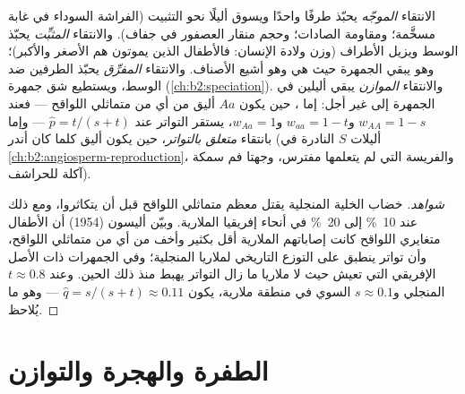 \begin{proposition}\label{prop:b2:population-genetics:kinds}
الانتقاء \emph{الموجّه} يحبّذ طرفًا واحدًا ويسوق
أليلًا نحو التثبيت (الفراشة السوداء في غابة مسخَّمة؛ ومقاومة
الصادات؛ وحجم منقار العصفور في جفاف).
والانتقاء \emph{المثبِّت} يحبّذ الوسط ويزيل
الأطراف (وزن ولادة الإنسان: فالأطفال الذين يموتون هم الأصغر
والأكبر)؛ وهو يبقي الجمهرة حيث هي وهو أشيع الأصناف.
والانتقاء \emph{المفرِّق} يحبّذ الطرفين
ضد الوسط، ويستطيع شق جمهرة
(\cref{ch:b2:speciation}). والانتقاء \emph{الموازن} يبقي
أليلين في الجمهرة إلى غير أجل: إما \emph{}، حين يكون $Aa$ أليق من أي من متماثلي اللواقح --- فعند
$w_{AA} = 1 - s$ و$w_{aa} = 1 - t$ و$w_{Aa} = 1$، يستقر التواتر
عند $\hat p = t/(s + t)$ --- وإما بانتقاء \emph{متعلق بالتواتر}،
حين يكون  أليق كلما كان أندر (أليلات
$S$ النادرة في \cref{ch:b2:angiosperm-reproduction}، والفريسة التي لم
يتعلمها مفترس، وجهتا فم سمكة آكلة للحراشف).
\end{proposition}
\begin{proof}[شواهد]
خضاب الخلية المنجلية يقتل معظم متماثلي اللواقح قبل أن
يتكاثروا، ومع ذلك  عند \qty{10}{\%} إلى \qty{20}{\%} في
أنحاء إفريقيا الملارية. وبيّن أليسون (1954) أن الأطفال متغايري اللواقح
كانت إصاباتهم الملارية أقل بكثير وأخف من أي من
متماثلي اللواقح، وأن تواتر  ينطبق على التوزع
التاريخي لملاريا المنجلية؛ وفي الجمهرات ذات الأصل
الإفريقي التي تعيش حيث لا ملاريا ما زال التواتر يهبط منذ ذلك الحين. وعند $t \approx 0.8$  المنجلي
و$s \approx 0.1$  السوي في منطقة ملارية،
يكون $\hat q = s/(s + t) \approx 0.11$ --- وهو ما يُلاحظ.
\end{proof}

\section{الطفرة والهجرة والتوازن}

